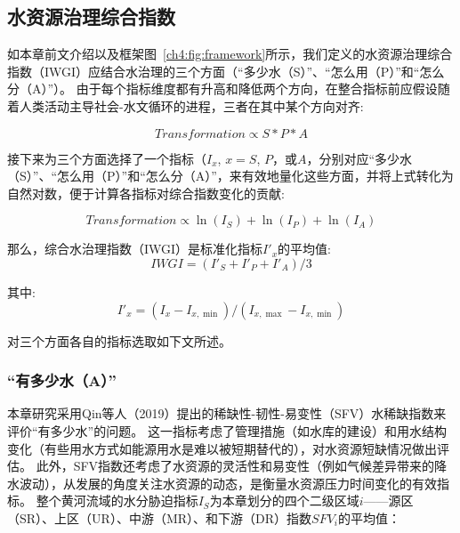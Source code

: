 
\subsection{水资源治理综合指数}

如本章前文介绍以及框架图~\ref{ch4:fig:framework}所示，我们定义的水资源治理综合指数（IWGI）应结合水治理的三个方面（“多少水（S）”、“怎么用（P）”和“怎么分（A）”）。
由于每个指标维度都有升高和降低两个方向，在整合指标前应假设随着人类活动主导社会-水文循环的进程，三者在其中某个方向对齐:

\begin{equation}
    Transformation \propto S*P*A
\end{equation}

接下来为三个方面选择了一个指标（$I_x$, $x=S$, $P$，或$A$，分别对应“多少水（S）”、“怎么用（P）”和“怎么分（A）”，来有效地量化这些方面，并将上式转化为自然对数，便于计算各指标对综合指数变化的贡献:

\begin{equation}
    Transformation \propto \ln(I_S) + \ln(I_P) + \ln(I_A)
\end{equation}

那么，综合水治理指数（IWGI）是标准化指标$I'_x$的平均值:
\begin{equation}
    IWGI = (I'_S + I'_P + I'_A) / 3
\end{equation}

其中:
\begin{equation}
    I'_x = (I_x - I_{x, \min}) / (I_{x, \max} - I_{x, \min})
\end{equation}

对三个方面各自的指标选取如下文所述。

\subsubsection*{“有多少水（A）”}

本章研究采用Qin等人（2019）提出的稀缺性-韧性-易变性（SFV）水稀缺指数来评价“有多少水”的问题\cite{qin2019}。
这一指标考虑了管理措施（如水库的建设）和用水结构变化（有些用水方式如能源用水是难以被短期替代的），对水资源短缺情况做出评估。
此外，SFV指数还考虑了水资源的灵活性和易变性（例如气候差异带来的降水波动），从发展的角度关注水资源的动态，是衡量水资源压力\cite{qin2019}时间变化的有效指标。
整个黄河流域的水分胁迫指标$I_S$为本章划分的四个二级区域$i$——源区（SR）、上区（UR）、中游（MR）、和下游（DR）指数$SFV_{i}$的平均值：


